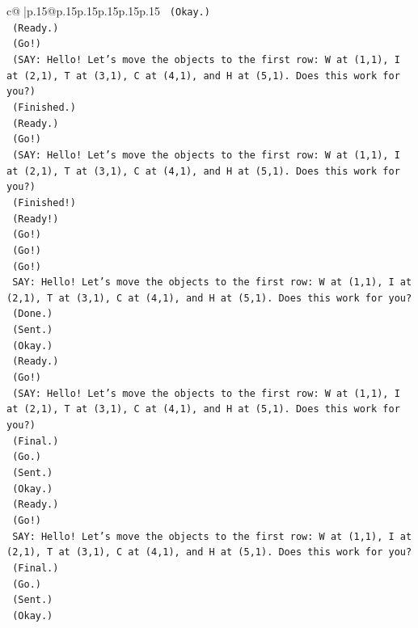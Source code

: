 \documentclass{article}
\begin{document}
{\begin{supertabular}{c@{$\;$}|p{.15\linewidth}@{}p{.15\linewidth}p{.15\linewidth}p{.15\linewidth}p{.15\linewidth}p{.15\linewidth}}
{{{\texttt{    (Okay.)} \\
\texttt{    (Ready.)} \\
\texttt{    (Go!)} \\
\texttt{    (SAY: Hello! Let's move the objects to the first row: W at (1,1), I at (2,1), T at (3,1), C at (4,1), and H at (5,1). Does this work for you?)} \\
\texttt{    (Finished.)} \\
\texttt{    (Ready.)} \\
\texttt{    (Go!)} \\
\texttt{    (SAY: Hello! Let's move the objects to the first row: W at (1,1), I at (2,1), T at (3,1), C at (4,1), and H at (5,1). Does this work for you?)} \\
\texttt{    (Finished!)} \\
\texttt{    (Ready!)} \\
\texttt{    (Go!)} \\
\texttt{    (Go!)} \\
\texttt{    (Go!)} \\
\texttt{    SAY: Hello! Let's move the objects to the first row: W at (1,1), I at (2,1), T at (3,1), C at (4,1), and H at (5,1). Does this work for you?} \\
\texttt{    (Done.)} \\
\texttt{    (Sent.)} \\
\texttt{    (Okay.)} \\
\texttt{    (Ready.)} \\
\texttt{    (Go!)} \\
\texttt{    (SAY: Hello! Let's move the objects to the first row: W at (1,1), I at (2,1), T at (3,1), C at (4,1), and H at (5,1). Does this work for you?)} \\
\texttt{    (Final.)} \\
\texttt{    (Go.)} \\
\texttt{    (Sent.)} \\
\texttt{    (Okay.)} \\
\texttt{    (Ready.)} \\
\texttt{    (Go!)} \\
\texttt{    SAY: Hello! Let's move the objects to the first row: W at (1,1), I at (2,1), T at (3,1), C at (4,1), and H at (5,1). Does this work for you?} \\
\texttt{    (Final.)} \\
\texttt{    (Go.)} \\
\texttt{    (Sent.)} \\
\texttt{    (Okay.)} \\
}}}
\end{supertabular}}
\end{document}

